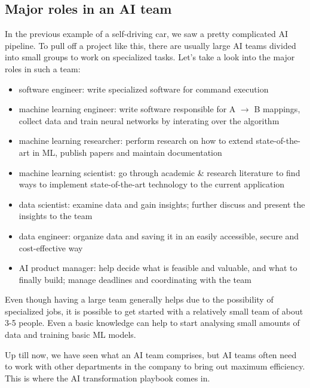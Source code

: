 \documentclass{article}[a4paper,12pt]
\theoremstyle{definition}
\begin{document}
\subsection{Major roles in an AI team}
In the previous example of a self-driving car, we saw a pretty complicated AI pipeline. To pull off a project like this, there are usually large AI teams divided into small groups to work on specialized tasks. Let's take a look into the major roles in such a team:
\begin{itemize}
	\item software engineer: write specialized software for command execution
	\item machine learning engineer: write software responsible for A $\rightarrow$ B mappings, collect data and train neural networks by interating over the algorithm
	\item machine learning researcher: perform research on how to extend state-of-the-art in ML, publish papers and maintain documentation
	\item machine learning scientist: go through academic \& research literature to find ways to implement state-of-the-art technology to the current application
	\item data scientist: examine data and gain insights; further discuss and present the insights to the team
	\item data engineer: organize data and saving it in an easily accessible, secure and cost-effective way
	\item AI product manager: help decide what is feasible and valuable, and what to finally build; manage deadlines and coordinating with the team
\end{itemize}
Even though having a large team generally helps due to the possibility of specialized jobs, it is possible to get started with a relatively small team of about 3-5 people. Even a basic knowledge can help to start analysing small amounts of data and training basic ML models.
\vspace{6pt}

Up till now, we have seen what an AI team comprises, but AI teams often need to work with other departments in the company to bring out maximum efficiency. This is where the AI transformation playbook comes in.
\end{document}
